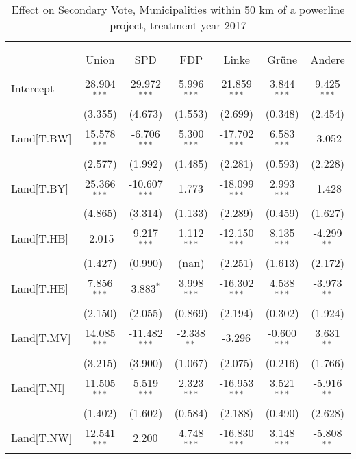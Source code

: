 \begin{table}[!htbp] \centering
  \caption{Effect on Secondary Vote, Municipalities within 50 km of a powerline project, treatment year 2017}
\begin{tabular}{@{\extracolsep{5pt}}lcccccc}
\\[-1.8ex]\hline
\hline \\[-1.8ex]
\\[-1.8ex] & \multicolumn{1}{c}{Union} & \multicolumn{1}{c}{SPD} & \multicolumn{1}{c}{FDP} & \multicolumn{1}{c}{Linke} & \multicolumn{1}{c}{Grüne} & \multicolumn{1}{c}{Andere}  \\
\hline \\[-1.8ex]
 Intercept & 28.904$^{***}$ & 29.972$^{***}$ & 5.996$^{***}$ & 21.859$^{***}$ & 3.844$^{***}$ & 9.425$^{***}$ \\
  & (3.355) & (4.673) & (1.553) & (2.699) & (0.348) & (2.454) \\
 Land[T.BW] & 15.578$^{***}$ & -6.706$^{***}$ & 5.300$^{***}$ & -17.702$^{***}$ & 6.583$^{***}$ & -3.052$^{}$ \\
  & (2.577) & (1.992) & (1.485) & (2.281) & (0.593) & (2.228) \\
 Land[T.BY] & 25.366$^{***}$ & -10.607$^{***}$ & 1.773$^{}$ & -18.099$^{***}$ & 2.993$^{***}$ & -1.428$^{}$ \\
  & (4.865) & (3.314) & (1.133) & (2.289) & (0.459) & (1.627) \\
 Land[T.HB] & -2.015$^{}$ & 9.217$^{***}$ & 1.112$^{***}$ & -12.150$^{***}$ & 8.135$^{***}$ & -4.299$^{**}$ \\
  & (1.427) & (0.990) & (nan) & (2.251) & (1.613) & (2.172) \\
 Land[T.HE] & 7.856$^{***}$ & 3.883$^{*}$ & 3.998$^{***}$ & -16.302$^{***}$ & 4.538$^{***}$ & -3.973$^{**}$ \\
  & (2.150) & (2.055) & (0.869) & (2.194) & (0.302) & (1.924) \\
 Land[T.MV] & 14.085$^{***}$ & -11.482$^{***}$ & -2.338$^{**}$ & -3.296$^{}$ & -0.600$^{***}$ & 3.631$^{**}$ \\
  & (3.215) & (3.900) & (1.067) & (2.075) & (0.216) & (1.766) \\
 Land[T.NI] & 11.505$^{***}$ & 5.519$^{***}$ & 2.323$^{***}$ & -16.953$^{***}$ & 3.521$^{***}$ & -5.916$^{**}$ \\
  & (1.402) & (1.602) & (0.584) & (2.188) & (0.490) & (2.628) \\
 Land[T.NW] & 12.541$^{***}$ & 2.200$^{}$ & 4.748$^{***}$ & -16.830$^{***}$ & 3.148$^{***}$ & -5.808$^{**}$ \\

\end{tabular}
\end{table}
